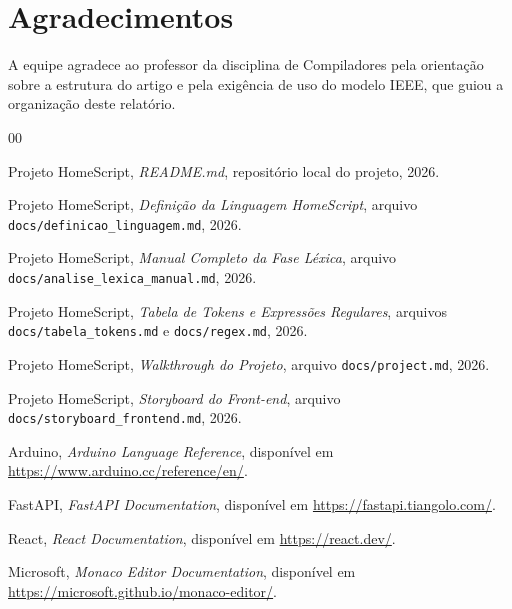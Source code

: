 \documentclass[conference]{IEEEtran}
\begin{document}
\section*{Agradecimentos}

A equipe agradece ao professor da disciplina de Compiladores pela orientação sobre a estrutura do artigo e pela exigência de uso do modelo IEEE, que guiou a organização deste relatório.

\balance

\begin{thebibliography}{00}

 Projeto HomeScript, \textit{README.md}, repositório local do projeto, 2026.

 Projeto HomeScript, \textit{Definição da Linguagem HomeScript}, arquivo \texttt{docs/definicao\_linguagem.md}, 2026.

 Projeto HomeScript, \textit{Manual Completo da Fase Léxica}, arquivo \texttt{docs/analise\_lexica\_manual.md}, 2026.

 Projeto HomeScript, \textit{Tabela de Tokens e Expressões Regulares}, arquivos \texttt{docs/tabela\_tokens.md} e \texttt{docs/regex.md}, 2026.

 Projeto HomeScript, \textit{Walkthrough do Projeto}, arquivo \texttt{docs/project.md}, 2026.

 Projeto HomeScript, \textit{Storyboard do Front-end}, arquivo \texttt{docs/storyboard\_frontend.md}, 2026.

 Arduino, \textit{Arduino Language Reference}, disponível em \url{https://www.arduino.cc/reference/en/}.

 FastAPI, \textit{FastAPI Documentation}, disponível em \url{https://fastapi.tiangolo.com/}.

 React, \textit{React Documentation}, disponível em \url{https://react.dev/}.

 Microsoft, \textit{Monaco Editor Documentation}, disponível em \url{https://microsoft.github.io/monaco-editor/}.

\end{thebibliography}
\end{document}

